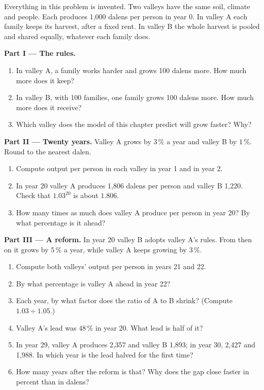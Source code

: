 \begin{problem}
\label{pb:g9:institutions-and-prosperity:1}
Everything in this problem is invented. Two valleys have the same soil, climate and people. Each produces
1,000 dalens per person in year 0. In valley A each family keeps its harvest, after a fixed rent. In valley B
the whole harvest is pooled and shared equally, whatever each family does.

\medskip
\noindent\textbf{Part I --- The rules.}
\begin{enumerate}
  \item In valley A, a family works harder and grows 100 dalens more. How much more does it keep?
  \item In valley B, with 100 families, one family grows 100 dalens more. How much more does it receive?
  \item Which valley does the model of this chapter predict will grow faster? Why?
\end{enumerate}

\medskip
\noindent\textbf{Part II --- Twenty years.} Valley A grows by $3\,\%$ a year and valley B by $1\,\%$.
Round to the nearest dalen.
\begin{enumerate}[resume]
  \item Compute output per person in each valley in year 1 and in year 2.
  \item In year 20 valley A produces 1,806 dalens per person and valley B 1,220. Check that $1.03^{20}$ is
        about $1.806$.
  \item How many times as much does valley A produce per person in year 20? By what percentage is it ahead?
\end{enumerate}

\medskip
\noindent\textbf{Part III --- A reform.} In year 20 valley B adopts valley A's rules. From then on it grows by
$5\,\%$ a year, while valley A keeps growing by $3\,\%$.
\begin{enumerate}[resume]
  \item Compute both valleys' output per person in years 21 and 22.
  \item By what percentage is valley A ahead in year 22?
  \item Each year, by what factor does the ratio of A to B shrink? (Compute $1.03 \div 1.05$.)
  \item Valley A's lead was $48\,\%$ in year 20. What lead is half of it?
  \item In year 29, valley A produces 2,357 and valley B 1,893; in year 30, 2,427 and 1,988. In which year
        is the lead halved for the first time?
  \item How many years after the reform is that? Why does the gap close faster in percent than in dalens?
\end{enumerate}
\end{problem}

